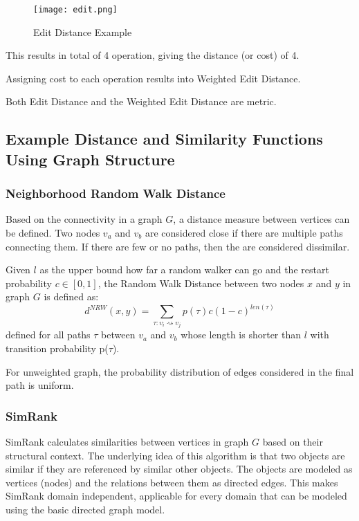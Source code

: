 \begin{figure}[ht]
	\centering
	\texttt{[image: edit.png]}
	\caption{Edit Distance Example} 
	\label{fig:edit}
\end{figure}
This results in total of 4 operation, giving the distance (or cost) of 4.

Assigning cost to each operation results into Weighted Edit Distance\cite{Chen:2004:MLE:1316689.1316758}.

Both Edit Distance and the Weighted Edit Distance are metric.

\subsection{Example Distance and Similarity Functions Using Graph Structure}

\subsubsection{Neighborhood Random Walk Distance}

Based on the connectivity in a graph $G$, a distance measure between vertices can be defined. 
Two nodes $v_{a}$ and $v_{b}$ are considered close if there are multiple paths connecting them. 
If there are few or no paths, then the are considered dissimilar.

\begin{definition}
	Given $l$ as the upper bound how far a random walker can go and the restart probability $c \in [0, 1]$, 
the Random Walk Distance between two nodes  $x$ and $y$ in graph $G$ is defined as:
\begin{equation}
	d^{NRW}(x,y) = \sum_{\tau:v_{i}\rightsquigarrow v_{j}}p(\tau)c(1-c)^{len(\tau)}
\end{equation}
defined for all paths $\tau$ between $v_{a}$ and $v_{b}$ whose length is shorter than $l$ with transition probability p($\tau$). 
\end{definition}

For unweighted graph, the probability distribution of edges considered in the final path is uniform.

\subsubsection{SimRank}
SimRank calculates similarities between vertices in graph $G$ based on their structural context\cite{Jeh02simrank:a}.
The underlying idea of this algorithm is that two objects are similar if they are referenced by similar other objects. 
The objects are modeled as vertices (nodes) and the relations between them as directed edges.
This makes SimRank domain independent, applicable for every domain that can be modeled using the basic directed graph model.

